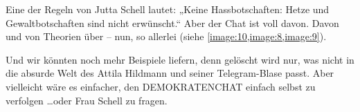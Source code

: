 Eine der Regeln von Jutta Schell lautet:  „Keine Hassbotschaften: Hetze und Gewaltbotschaften sind nicht erwünscht.“ Aber der Chat ist voll davon. Davon und von Theorien über – nun, so allerlei (siehe \cref{image:10,image:8,image:9}).
\begin{figure}[hbt!]\centering
  \caption{}
\end{figure}

Und wir könnten noch mehr Beispiele liefern, denn gelöscht wird nur, was nicht in die absurde Welt des Attila Hildmann und seiner Telegram-Blase passt. Aber vielleicht wäre es einfacher, den DEMOKRATENCHAT einfach selbst zu verfolgen \dots oder Frau Schell zu fragen.

